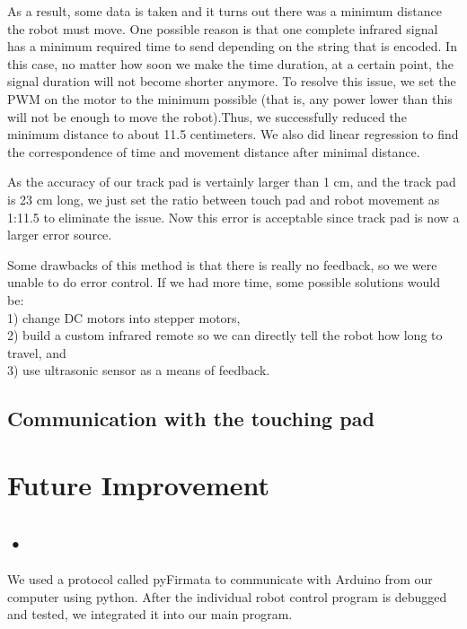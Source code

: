 \documentclass[reprint,amsmath, amsfonts, amssymb, aps, letterpaper]{revtex4-1}
\begin{document}
As a result, some data is taken and it turns out there was a minimum distance the robot must move. One possible reason is that one complete infrared signal has a minimum required time to send depending on the string that is encoded. In this case, no matter how soon we make the time duration, at a certain point, the signal duration will not become shorter anymore. To resolve this issue, we set the PWM on the motor to the minimum possible (that is, any power lower than this will not be enough to move the robot).Thus, we successfully reduced the minimum distance to about 11.5 centimeters. We also did linear regression to find the correspondence of time and movement distance after minimal distance.

As the accuracy of our track pad is vertainly larger than 1 cm, and the track pad is 23 cm long, we just set the ratio between touch pad and robot movement as 1:11.5 to eliminate the issue. Now this error is acceptable since track pad is now a larger error source.

Some drawbacks of this method is that there is really no feedback, so we were unable to do error control. If we had more time, some possible solutions would be: \\
1) change DC motors into stepper motors, \\
2) build a custom infrared remote so we can directly tell the robot how long to travel, and \\
3) use ultrasonic sensor as a means of feedback.
\subsection{Communication with the touching pad}


\section{Future Improvement}
\subsection{•}

We used a protocol called pyFirmata to communicate with Arduino from our computer using python. After the individual robot control program is debugged and tested, we integrated it into our main program.


\nocite{*}
\end{document}

